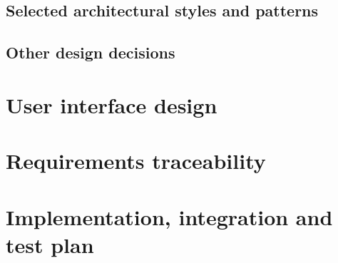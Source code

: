 \documentclass[a4paper,oneside,11pt]{article}
\begin{document}
        \subsection{Selected architectural styles and patterns}
            
        \subsection{Other design decisions}
            
        
    \newpage
    \section{User interface design}
        
    \newpage
    \newpage
    \section{Requirements traceability}
        
    \newpage
    \section{Implementation, integration and test plan}
        

    \newpage
    
\end{document}
